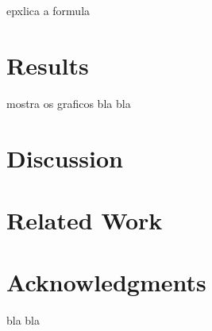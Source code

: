 \documentclass{sig-alternate}
\begin{document}
epxlica a formula

\section{Results}

mostra os graficos bla bla

\section{Discussion}

\section{Related Work}

\section{Acknowledgments}

bla bla



\end{document}
